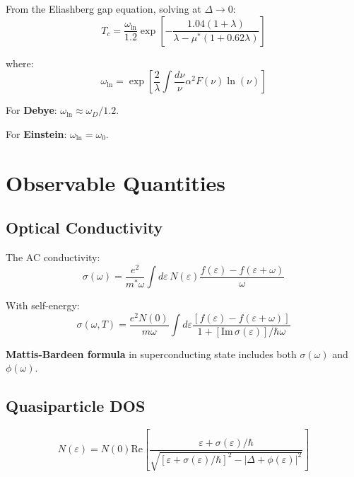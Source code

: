 \documentclass[12pt]{article}
\begin{document}
From the Eliashberg gap equation, solving at $\Delta \to 0$:
\begin{equation}
\boxed{
T_c = \frac{\omega_{\text{ln}}}{1.2} \exp\left[-\frac{1.04(1 + \lambda)}{\lambda - \mu^*(1 + 0.62\lambda)}\right]
}
\end{equation}

where:
\begin{equation}
\omega_{\text{ln}} = \exp\left[\frac{2}{\lambda}\int \frac{d\nu}{\nu} \alpha^2F(\nu) \ln(\nu)\right]
\end{equation}

For \textbf{Debye}: $\omega_{\text{ln}} \approx \omega_D/1.2$.

For \textbf{Einstein}: $\omega_{\text{ln}} = \omega_0$.

\section{Observable Quantities}

\subsection{Optical Conductivity}

The AC conductivity:
\begin{equation}
\sigma(\omega) = \frac{e^2}{m^*\omega} \int d\varepsilon \, N(\varepsilon) \frac{f(\varepsilon) - f(\varepsilon + \omega)}{\omega}
\end{equation}

With self-energy:
\begin{equation}
\boxed{
\sigma(\omega,T) = \frac{e^2 N(0)}{m\omega} \int d\varepsilon \frac{[f(\varepsilon) - f(\varepsilon+\omega)]}{1 + [\text{Im}\,\sigma(\varepsilon)]/\hbar\omega}
}
\end{equation}

\textbf{Mattis-Bardeen formula} in superconducting state includes both $\sigma(\omega)$ and $\phi(\omega)$.

\subsection{Quasiparticle DOS}

\begin{equation}
N(\varepsilon) = N(0) \text{Re}\left[\frac{\varepsilon + \sigma(\varepsilon)/\hbar}{\sqrt{[\varepsilon + \sigma(\varepsilon)/\hbar]^2 - |\Delta + \phi(\varepsilon)|^2}}\right]
\end{equation}
\end{document}
